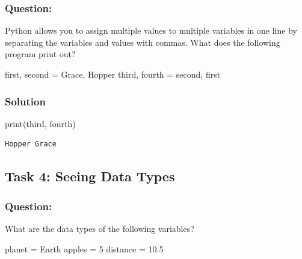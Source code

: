 \documentclass[
  letterpaper,
  DIV=11,
  numbers=noendperiod]{scrartcl}
\newenvironment{Shaded}{\begin{snugshade}}{\end{snugshade}}
\newcommand{\BuiltInTok}[1]{\textcolor[rgb]{0.00,0.23,0.31}{#1}}
\newcommand{\DecValTok}[1]{\textcolor[rgb]{0.68,0.00,0.00}{#1}}
\newcommand{\FloatTok}[1]{\textcolor[rgb]{0.68,0.00,0.00}{#1}}
\newcommand{\NormalTok}[1]{\textcolor[rgb]{0.00,0.23,0.31}{#1}}
\newcommand{\OperatorTok}[1]{\textcolor[rgb]{0.37,0.37,0.37}{#1}}
\newcommand{\StringTok}[1]{\textcolor[rgb]{0.13,0.47,0.30}{#1}}
\begin{document}
\subsubsection{Question:}

Python allows you to assign multiple values to multiple variables in one
line by separating the variables and values with commas. What does the
following program print out?

\begin{Shaded}
\begin{Highlighting}[]
\NormalTok{first, second }\OperatorTok{=} \StringTok{\textquotesingle{}Grace\textquotesingle{}}\NormalTok{, }\StringTok{\textquotesingle{}Hopper\textquotesingle{}}
\NormalTok{third, fourth }\OperatorTok{=}\NormalTok{ second, first}
\end{Highlighting}
\end{Shaded}

\subsubsection{Solution}

\begin{Shaded}
\begin{Highlighting}[]
\BuiltInTok{print}\NormalTok{(third, fourth)}
\end{Highlighting}
\end{Shaded}

\begin{verbatim}
Hopper Grace
\end{verbatim}

\subsection{Task 4: Seeing Data Types}\label{task-4-seeing-data-types}

\subsubsection{Question:}

What are the data types of the following variables?

\begin{Shaded}
\begin{Highlighting}[]
\NormalTok{planet }\OperatorTok{=} \StringTok{\textquotesingle{}Earth\textquotesingle{}}
\NormalTok{apples }\OperatorTok{=} \DecValTok{5}
\NormalTok{distance }\OperatorTok{=} \FloatTok{10.5}
\end{Highlighting}
\end{Shaded}
\end{document}
